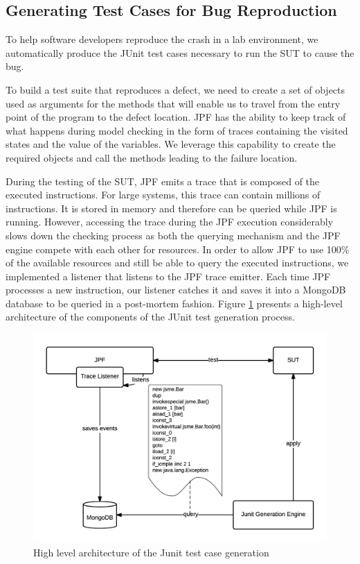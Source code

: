 \documentclass[12pt]{report}
\begin{document}
\subsection{\texorpdfstring{Generating Test Cases for Bug
Reproduction\label{sec:unit-tests}}{Generating Test Cases for Bug Reproduction}}\label{generating-test-cases-for-bug-reproduction}

To help software developers reproduce the crash in a lab environment, we
automatically produce the JUnit test cases necessary to run the SUT to
cause the bug.

To build a test suite that reproduces a defect, we need to create a set
of objects used as arguments for the methods that will enable us to
travel from the entry point of the program to the defect location. JPF
has the ability to keep track of what happens during model checking in
the form of traces containing the visited states and the value of the
variables. We leverage this capability to create the required objects
and call the methods leading to the failure location.

During the testing of the SUT, JPF emits a trace that is composed of the
executed instructions. For large systems, this trace can contain
millions of instructions. It is stored in memory and therefore can be
queried while JPF is running. However, accessing the trace during the
JPF execution considerably slows down the checking process as both the
querying mechanism and the JPF engine compete with each other for
resources. In order to allow JPF to use 100\% of the available resources
and still be able to query the executed instructions, we implemented a
listener that listens to the JPF trace emitter. Each time JPF processes
a new instruction, our listener catches it and saves it into a MongoDB
database to be queried in a post-mortem fashion. Figure
\ref{fig:jcharming-unittest} presents a high-level architecture of the
components of the JUnit test generation process.

\begin{figure}
  \centering
    \includegraphics[scale=0.8]{media/chap8/unittest.png}
    \caption{High level architecture of the Junit test case generation
    \label{fig:jcharming-unittest}}
\end{figure}
\end{document}
